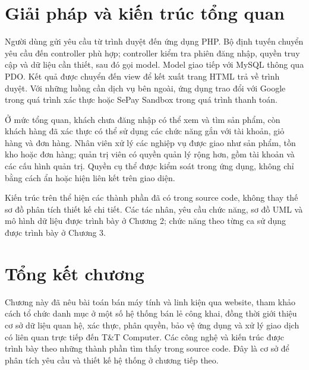 \section{Giải pháp và kiến trúc tổng quan}
Người dùng gửi yêu cầu từ trình duyệt đến ứng dụng PHP. Bộ định tuyến chuyển yêu cầu đến controller phù hợp; controller kiểm tra phiên đăng nhập, quyền truy cập và dữ liệu cần thiết, sau đó gọi model. Model giao tiếp với MySQL thông qua PDO. Kết quả được chuyển đến view để kết xuất trang HTML trả về trình duyệt. Với những luồng cần dịch vụ bên ngoài, ứng dụng trao đổi với Google trong quá trình xác thực hoặc SePay Sandbox trong quá trình thanh toán.

Ở mức tổng quan, khách chưa đăng nhập có thể xem và tìm sản phẩm, còn khách hàng đã xác thực có thể sử dụng các chức năng gắn với tài khoản, giỏ hàng và đơn hàng. Nhân viên xử lý các nghiệp vụ được giao như sản phẩm, tồn kho hoặc đơn hàng; quản trị viên có quyền quản lý rộng hơn, gồm tài khoản và các cấu hình quản trị. Quyền cụ thể được kiểm soát trong ứng dụng, không chỉ bằng cách ẩn hoặc hiện liên kết trên giao diện.

Kiến trúc trên thể hiện các thành phần đã có trong source code, không thay thế sơ đồ phân tích thiết kế chi tiết. Các tác nhân, yêu cầu chức năng, sơ đồ UML và mô hình dữ liệu được trình bày ở Chương 2; chức năng theo từng ca sử dụng được trình bày ở Chương 3.

\section{Tổng kết chương}
Chương này đã nêu bài toán bán máy tính và linh kiện qua website, tham khảo cách tổ chức danh mục ở một số hệ thống bán lẻ công khai, đồng thời giới thiệu cơ sở dữ liệu quan hệ, xác thực, phân quyền, bảo vệ ứng dụng và xử lý giao dịch có liên quan trực tiếp đến T\&T Computer. Các công nghệ và kiến trúc được trình bày theo những thành phần tìm thấy trong source code. Đây là cơ sở để phân tích yêu cầu và thiết kế hệ thống ở chương tiếp theo.
